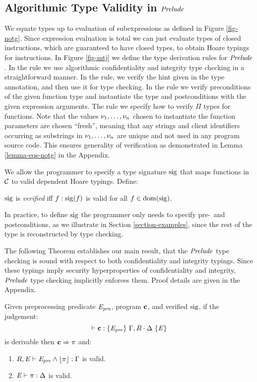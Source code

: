 \subsection{Algorithmic Type Validity in $\mathit{Prelude}$}

\mtjfig

We equate types up to evaluation of subexpressions as defined in
Figure \ref{fig-notg}. Since expression evaluation is total we can
just evaluate types of closed instructions, which are guaranteed to
have closed types, to obtain Hoare typings for instructions. In Figure
\ref{fig-mtj} we define the type derivation rules for $\mathit{Prelude}$. In
the  rule we use algorithmic confidentiality and
integrity type checking in a straightforward manner.  In the
 rule, we verify the hint given in the type
annotation, and then use it for type checking.  In the 
rule we verify preconditions of the given function type and
instantiate the type and postconditions with the given expression
arguments.  The  rule we specify how to verify $\Pi$
types for functions. Note that the values $\nu_1,\ldots,\nu_n$ chosen
to instantiate the function parameters are chosen ``fresh'', meaning
that any strings and client identifiers occurring as substrings in
$\nu_1,\ldots,\nu_n$ are unique and not used in any program source
code. This ensures generality of verification as demonstrated in Lemma
\ref{lemma-eqs-notg} in the Appendix.

\mtjfnfig

We allow the programmer to specify a type signature $\mathrm{sig}$ that
maps functions in $\mathcal{C}$ to valid dependent Hoare
typings. Define:
\begin{definition}
  $\mathrm{sig}$ is \emph{verified} iff $f : \mathrm{sig}(f)$ is valid for all $f \in \mathrm{dom}(\mathrm{sig})$.
\end{definition}
In practice, to define $\mathrm{sig}$ the programmer only needs to specify
pre-~and postconditions, as we illustrate in Section
\ref{section-examples}, since the rest of the type is reconstructed by
type checking.

The following Theorem establishes our main result, that the
$\mathit{Prelude}$ type checking is sound with respect to both
confidentiality and integrity typings. Since these typings imply
security hyperproperties of confidentiality and integrity, $\mathit{Prelude}$
type checking implicitly enforces them. Proof details are given in the
Appendix.
\begin{theorem}
  \label{theorem-mtj}
  Given preprocessing predicate $\mathit{E}_{\mathit{pre}}$, program $\mathbf{c}$, and verified $\mathrm{sig}$, if
  the judgement: $$\vdash \mathbf{c} : \{ \mathit{E}_{\mathit{pre}} \}\ \Gamma,R \cdot \Delta\ \{ \mathit{E} \}$$ is derivable then
  $\mathbf{c} \Rightarrow \pi$ and:
  \begin{enumerate}
  \item $R,\mathit{E} \vdash \mathit{E}_{\mathit{pre}} \wedge \lfloor \pi \rfloor : \Gamma$ is valid.
  \item $\mathit{E} \vdash \pi : \Delta$ is valid.
  \end{enumerate}
\end{theorem}


